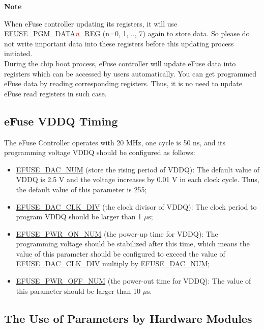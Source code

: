 \documentclass[main\_\_EN.tex]{subfiles}
\begin{document}
{\bfseries Note}


When eFuse controller updating its registers, it will use \hyperref[regdesc:EFUSEPGMDATA0REG]{EFUSE\_PGM\_DATA\textcolor{red}{\it{n}}\_REG} (n=0, 1, .., 7) again to store data. So please do not write important data into these registers before this updating process initiated. \\
During the chip boot process, eFuse controller will update eFuse data into registers which can be accessed by users automatically. You can get programmed eFuse data by reading corresponding registers. Thus, it is no need to update eFuse read registers in such case.

\subsection{eFuse VDDQ Timing}
\label{sec:efuse-vddq-timing}

The eFuse Controller operates with 20 MHz, one cycle is 50 ns, and its programming voltage VDDQ should be configured as follows:

\begin{itemize}
    \item \hyperref[fielddesc:EFUSEDACNUM]{EFUSE\_DAC\_NUM} (store the rising period of VDDQ): The default value of VDDQ is 2.5 V and the voltage increases by 0.01 V in each clock cycle. Thus, the default value of this parameter is 255;
    \item \hyperref[fielddesc:EFUSEDACCLKDIV]{EFUSE\_DAC\_CLK\_DIV} (the clock divisor of VDDQ): The clock period to program VDDQ should be larger than 1 $\mu$s;
    \item \hyperref[fielddesc:EFUSEPWRONNUM]{EFUSE\_PWR\_ON\_NUM} (the power-up time for VDDQ): The programming voltage should be stabilized after this time, which means the value of this parameter should be configured to exceed the value of \hyperref[fielddesc:EFUSEDACCLKDIV]{EFUSE\_DAC\_CLK\_DIV} multiply by \hyperref[fielddesc:EFUSEDACNUM]{EFUSE\_DAC\_NUM};
    \item \hyperref[fielddesc:EFUSEPWROFFNUM]{EFUSE\_PWR\_OFF\_NUM} (the power-out time for VDDQ): The value of this parameter should be larger than 10 $\mu$s.
\end{itemize}



\subsection{The Use of Parameters by Hardware Modules}
\end{document}
